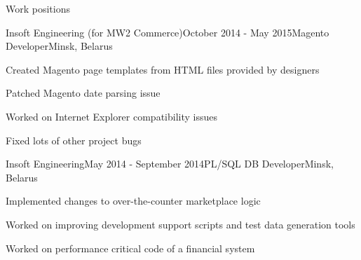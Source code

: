 \documentclass{resume} %
\begin{document}
\begin{rSection}{Work positions}
\begin{rSubsection}{Insoft Engineering (for MW2 Commerce)}{October 2014 - May 2015}{Magento Developer}{Minsk, Belarus}
\item Created Magento page templates from HTML files provided by designers
\item Patched Magento date parsing issue
\item Worked on Internet Explorer compatibility issues
\item Fixed lots of other project bugs
\end{rSubsection}

\begin{rSubsection}{Insoft Engineering}{May 2014 - September 2014}{PL/SQL DB Developer}{Minsk, Belarus}
\item Implemented changes to over-the-counter marketplace logic
\item Worked on improving development support scripts and test data generation tools
\item Worked on performance critical code of a financial system
\end{rSubsection}

\end{rSection}

\end{document}
